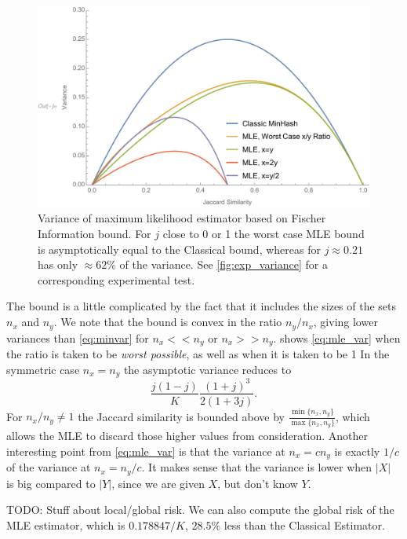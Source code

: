 \begin{figure}
\includegraphics[trim=30 0 0 0,clip,width=\linewidth]{figures/mle_variance2}
\caption{Variance of maximum likelihood estimator based on Fischer Information bound.
For $j$ close to 0 or 1 the worst case MLE bound is asymptotically equal to the Classical bound, whereas for $j\approx 0.21$ has only $\approx 62\%$ of the variance.
See \cref{fig:exp_variance} for a corresponding experimental test.
}
\label{fig:mle_variance}
\end{figure}

The bound is a little complicated by the fact that it includes the sizes of the sets $n_x$ and $n_y$.
We note that the bound is convex in the ratio $n_y/n_x$, giving lower variances than \cref{eq:minvar} for $n_x<\!<n_y$ or $n_x >\!> n_y$.
 shows \cref{eq:mle_var} when the ratio is taken to be \emph{worst possible}, as well as when it is taken to be 1
In the symmetric case $n_x=n_y$ the asymptotic variance reduces to
\[
   \frac{j(1-j)}{K}\frac{(1+j)^3}{2(1+3j)}.
\]
For $n_x/n_y\neq1$ the Jaccard similarity is bounded above by $\frac{\min\{n_x,n_y\}}{\max\{n_x,n_y\}}$, which allows the MLE to discard those higher values from consideration.
Another interesting point from \cref{eq:mle_var} is that the variance at $n_x=c n_y$ is exactly $1/c$ of the variance at $n_x=n_y/c$.
It makes sense that the variance is lower when $|X|$ is big compared to $|Y|$, since we are given $X$, but don't know $Y$.

TODO: Stuff about local/global risk.
We can also compute the global risk of the MLE estimator, which is $0.178847/K$, $28.5\%$ less than the Classical Estimator.

